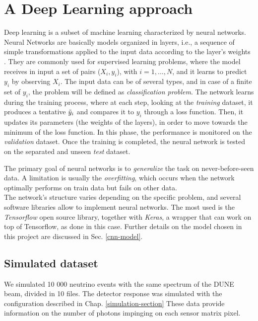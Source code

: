\section{A Deep Learning approach}
Deep learning is a subset of machine learning characterized by neural networks. Neural Networks are basically models organized in layers, i.e., a sequence of simple transformations applied to the input data according to the layer's weights \cite{deep-learn-python}. They are commonly used for supervised learning problems, where the model receives in input a set of pairs ($X_i, y_i$), with $i=1,...,N$, and it learns to predict $y_i$ by observing $X_i$. The input data can be of several types, and in case of a finite set of $y_i$, the problem will be defined as \textit{classification problem}. The network learns during the training process, where at each step, looking at the \textit{training} dataset, it produces a tentative $\Tilde{y}_i$ and compares it to $y_i$ through a loss function. Then, it updates its parameters (the weights of the layers), in order to move towards the minimum of the loss function. In this phase, the performance is monitored on the \textit{validation} dataset.
Once the training is completed, the neural network is tested on the separated and unseen \textit{test} dataset.

The primary goal of neural networks is to \textit{generalize} the task on never-before-seen data. A limitation is usually the \textit{overfitting}, which occurs when the network optimally performs on train data but fails on other data. \\
The network's structure varies depending on the specific problem, and several software libraries allow to implement neural networks. The most used is the \textit{Tensorflow} open source library, together with \textit{Keras}, a wrapper that can work on top of Tensorflow, as done in this case. Further details on the model chosen in this project are discussed in Sec. \ref{cnn-model}.

\subsection{Simulated dataset}
We simulated 10 000 neutrino events with the same spectrum of the DUNE beam, divided in 10 files.
The detector response was simulated with the configuration described in Chap. \ref{simulation-section} These data provide information on the number of photons impinging on each sensor matrix pixel.

